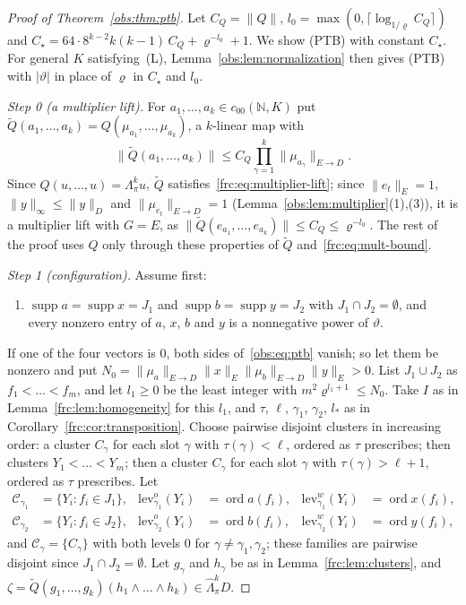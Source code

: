 \documentclass[11pt]{amsart}
\theoremstyle{definition}
\theoremstyle{remark}
\numberwithin{equation}{section}
\newcommand{\N}{\mathbb N}
\newcommand{\abs}[1]{\lvert #1\rvert}
\newcommand{\norm}[1]{\lVert #1\rVert}
\newcommand{\cC}{\mathcal{C}}
\newcommand{\ord}{\operatorname{ord}}
\theoremstyle{plain}
\theoremstyle{definition}
\theoremstyle{plain}
\begin{document}
\begin{proof}[Proof of Theorem~\ref{obs:thm:ptb}]
Let $C_Q=\norm Q$, $l_0=\max(0,\lceil\log_{1/\varrho}C_Q\rceil)$ and $C_\star=64\cdot8^{k-2}k(k-1)\,C_Q+\varrho^{-l_0}+1$.
We show \textup{(PTB)} with constant $C_\star$. For general $K$ satisfying~\textup{(L)},
Lemma~\ref{obs:lem:normalization} then gives \textup{(PTB)} with $\abs\vartheta$ in place of $\varrho$ in $C_\star$ and $l_0$.

\emph{Step 0 (a multiplier lift).} For $a_1,\dots,a_k\in c_{00}(\N,K)$ put
$\widetilde Q(a_1,\dots,a_k)=Q(\mu_{a_1},\dots,\mu_{a_k})$, a $k$\nobreakdash-linear map with
\begin{equation}\label{frc:eq:mult-bound}
 \norm{\widetilde Q(a_1,\dots,a_k)}\le C_Q\prod_{\gamma=1}^k\norm{\mu_{a_\gamma}}_{E\to D}.
\end{equation}
Since $Q(u,\dots,u)=\Lambda^k_\pi u$, $\widetilde Q$ satisfies~\eqref{frc:eq:multiplier-lift}; since $\norm{e_t}_E=1$,
$\norm y_\infty\le\norm y_D$ and $\norm{\mu_{e_t}}_{E\to D}=1$ (Lemma~\ref{obs:lem:multiplier}(1),(3)), it is a multiplier
lift with $G=E$, as $\norm{\widetilde Q(e_{a_1},\dots,e_{a_k})}\le C_Q\le\varrho^{-l_0}$. The rest of the proof uses $Q$
only through these properties of $\widetilde Q$ and~\eqref{frc:eq:mult-bound}.

\emph{Step 1 (configuration).} Assume first:
\begin{enumerate}
\item[(A)] $\operatorname{supp}a=\operatorname{supp}x=J_1$ and $\operatorname{supp}b=\operatorname{supp}y=J_2$ with
$J_1\cap J_2=\emptyset$, and every nonzero entry of $a$, $x$, $b$ and $y$ is a nonnegative power of $\vartheta$.
\end{enumerate}
If one of the four vectors is $0$, both sides of~\eqref{obs:eq:ptb} vanish; so let them be nonzero and put
$N_0=\norm{\mu_a}_{E\to D}\norm x_E\norm{\mu_b}_{E\to D}\norm y_E>0$. List $J_1\cup J_2$ as $f_1<\dots<f_m$, and let
$l_1\ge0$ be the least integer with $m^2\varrho^{l_1+1}\le N_0$. Take $I$ as in Lemma~\ref{frc:lem:homogeneity} for this
$l_1$, and $\tau$, $\ell$, $\gamma_1$, $\gamma_2$, $l_*$ as in Corollary~\ref{frc:cor:transposition}. Choose pairwise
disjoint clusters in increasing order: a cluster $C_\gamma$ for each slot $\gamma$ with $\tau(\gamma)<\ell$, ordered as
$\tau$ prescribes; then clusters $Y_1<\dots<Y_m$; then a cluster $C_\gamma$ for each slot $\gamma$ with
$\tau(\gamma)>\ell+1$, ordered as $\tau$ prescribes. Let
\begin{align*}
 \cC_{\gamma_1}&=\{Y_i:f_i\in J_1\},& \mathrm{lev}^o_{\gamma_1}(Y_i)&=\ord a(f_i),& \mathrm{lev}^w_{\gamma_1}(Y_i)&=\ord x(f_i),\\
 \cC_{\gamma_2}&=\{Y_i:f_i\in J_2\},& \mathrm{lev}^o_{\gamma_2}(Y_i)&=\ord b(f_i),& \mathrm{lev}^w_{\gamma_2}(Y_i)&=\ord y(f_i),
\end{align*}
and $\cC_\gamma=\{C_\gamma\}$ with both levels $0$ for $\gamma\ne\gamma_1,\gamma_2$; these families are pairwise disjoint
since $J_1\cap J_2=\emptyset$. Let $g_\gamma$ and $h_\gamma$ be as in Lemma~\ref{frc:lem:clusters}, and
$\zeta=\widetilde Q(g_1,\dots,g_k)(h_1\wedge\dots\wedge h_k)\in\widehat\Lambda^k_\pi D$.


\end{proof}
\end{document}
